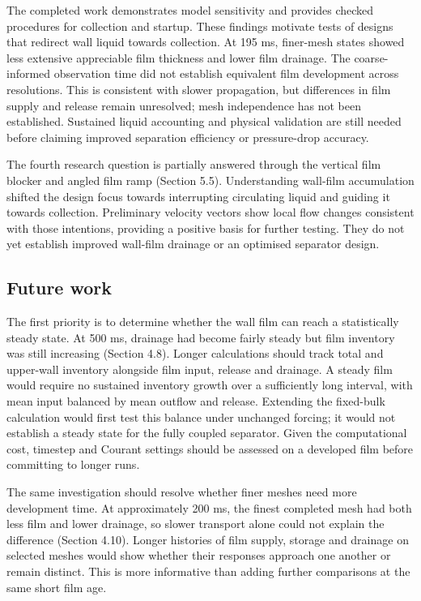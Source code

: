 \documentclass[12pt]{article}
\begin{document}
The completed work demonstrates model sensitivity and provides checked procedures for collection and startup. These findings motivate tests of designs that redirect wall liquid towards collection. At 195 ms, finer-mesh states showed less extensive appreciable film thickness and lower film drainage. The coarse-informed observation time did not establish equivalent film development across resolutions. This is consistent with slower propagation, but differences in film supply and release remain unresolved; mesh independence has not been established. Sustained liquid accounting and physical validation are still needed before claiming improved separation efficiency or pressure-drop accuracy.

The fourth research question is partially answered through the vertical film blocker and angled film ramp (Section 5.5). Understanding wall-film accumulation shifted the design focus towards interrupting circulating liquid and guiding it towards collection. Preliminary velocity vectors show local flow changes consistent with those intentions, providing a positive basis for further testing. They do not yet establish improved wall-film drainage or an optimised separator design.

\subsection{Future work}\label{future-work}

The first priority is to determine whether the wall film can reach a statistically steady state. At 500 ms, drainage had become fairly steady but film inventory was still increasing (Section 4.8). Longer calculations should track total and upper-wall inventory alongside film input, release and drainage. A steady film would require no sustained inventory growth over a sufficiently long interval, with mean input balanced by mean outflow and release. Extending the fixed-bulk calculation would first test this balance under unchanged forcing; it would not establish a steady state for the fully coupled separator. Given the computational cost, timestep and Courant settings should be assessed on a developed film before committing to longer runs.

The same investigation should resolve whether finer meshes need more development time. At approximately 200 ms, the finest completed mesh had both less film and lower drainage, so slower transport alone could not explain the difference (Section 4.10). Longer histories of film supply, storage and drainage on selected meshes would show whether their responses approach one another or remain distinct. This is more informative than adding further comparisons at the same short film age.
\end{document}
